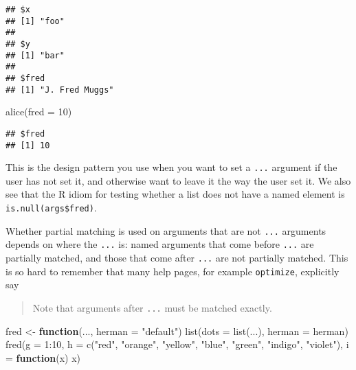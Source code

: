 \documentclass[
]{article}
\newenvironment{Shaded}{\begin{snugshade}}{\end{snugshade}}
\newcommand{\AttributeTok}[1]{\textcolor[rgb]{0.77,0.63,0.00}{#1}}
\newcommand{\ControlFlowTok}[1]{\textcolor[rgb]{0.13,0.29,0.53}{\textbf{#1}}}
\newcommand{\DecValTok}[1]{\textcolor[rgb]{0.00,0.00,0.81}{#1}}
\newcommand{\FunctionTok}[1]{\textcolor[rgb]{0.00,0.00,0.00}{#1}}
\newcommand{\NormalTok}[1]{#1}
\newcommand{\OtherTok}[1]{\textcolor[rgb]{0.56,0.35,0.01}{#1}}
\newcommand{\SpecialCharTok}[1]{\textcolor[rgb]{0.00,0.00,0.00}{#1}}
\newcommand{\StringTok}[1]{\textcolor[rgb]{0.31,0.60,0.02}{#1}}
\begin{document}
\begin{verbatim}
## $x
## [1] "foo"
## 
## $y
## [1] "bar"
## 
## $fred
## [1] "J. Fred Muggs"
\end{verbatim}

\begin{Shaded}
\begin{Highlighting}[]
\FunctionTok{alice}\NormalTok{(}\AttributeTok{fred =} \DecValTok{10}\NormalTok{)}
\end{Highlighting}
\end{Shaded}

\begin{verbatim}
## $fred
## [1] 10
\end{verbatim}

This is the design pattern you use when you want to set a \texttt{...}
argument if the user has not set it, and otherwise want to leave it the
way the user set it. We also see that the R idiom for testing whether a
list does not have a named element is \texttt{is.null(args\$fred)}.

Whether partial matching is used on arguments that are not \texttt{...}
arguments depends on where the \texttt{...} is: named arguments that
come before \texttt{...} are partially matched, and those that come
after \texttt{...} are not partially matched. This is so hard to
remember that many help pages, for example \texttt{optimize}, explicitly
say

\begin{quote}
Note that arguments after \texttt{...} must be matched exactly.
\end{quote}

\begin{Shaded}
\begin{Highlighting}[]
\NormalTok{fred }\OtherTok{\textless{}{-}} \ControlFlowTok{function}\NormalTok{(..., }\AttributeTok{herman =} \StringTok{"default"}\NormalTok{)}
    \FunctionTok{list}\NormalTok{(}\AttributeTok{dots =} \FunctionTok{list}\NormalTok{(...), }\AttributeTok{herman =}\NormalTok{ herman)}
\FunctionTok{fred}\NormalTok{(}\AttributeTok{g =} \DecValTok{1}\SpecialCharTok{:}\DecValTok{10}\NormalTok{, }\AttributeTok{h =} \FunctionTok{c}\NormalTok{(}\StringTok{"red"}\NormalTok{, }\StringTok{"orange"}\NormalTok{, }\StringTok{"yellow"}\NormalTok{, }\StringTok{"blue"}\NormalTok{,}
    \StringTok{"green"}\NormalTok{, }\StringTok{"indigo"}\NormalTok{, }\StringTok{"violet"}\NormalTok{), }\AttributeTok{i =} \ControlFlowTok{function}\NormalTok{(x) x)}
\end{Highlighting}
\end{Shaded}
\end{document}
